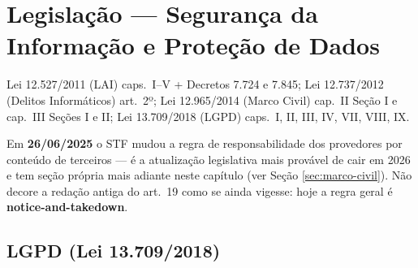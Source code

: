 \chapter{Legislação --- Segurança da Informação e Proteção de Dados}
\label{cap:legislacao}

\begin{edital}
Lei 12.527/2011 (LAI) caps.\ I--V + Decretos 7.724 e 7.845; Lei 12.737/2012
(Delitos Informáticos) art.\ 2º; Lei 12.965/2014 (Marco Civil) cap.\ II Seção
I e cap.\ III Seções I e II; Lei 13.709/2018 (LGPD) caps.\ I, II, III, IV,
VII, VIII, IX.
\end{edital}

\begin{pegadinha}
Em \textbf{26/06/2025} o STF mudou a regra de responsabilidade dos provedores
por conteúdo de terceiros --- é a atualização legislativa mais provável de
cair em 2026 e tem seção própria mais adiante neste capítulo (ver
Seção \ref{sec:marco-civil}). Não decore a redação antiga do art.\ 19 como se
ainda vigesse: hoje a regra geral é \textbf{notice-and-takedown}.
\end{pegadinha}

\section{LGPD (Lei 13.709/2018)}

